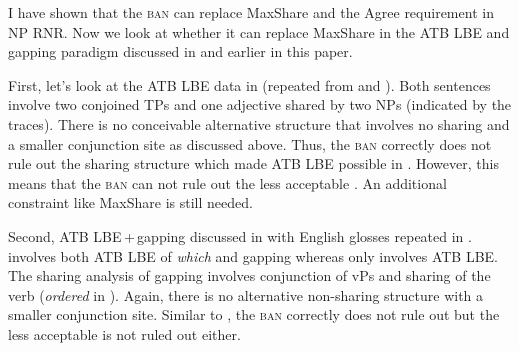 \documentclass[output=paper]{langscibook}
\begin{document}
I have shown that the \textsc{ban} can replace MaxShare and the Agree requirement in NP RNR. Now we look at whether it can replace MaxShare in the ATB LBE and gapping paradigm discussed in \citet{Citko:2006} and earlier in this paper.

First, let's look at the ATB LBE data in  (repeated from  and ). 
Both sentences involve two conjoined TPs and one adjective shared by two NPs (indicated by the traces). 
There is no conceivable alternative structure that involves no sharing and a smaller conjunction site as discussed above.  
Thus, the \textsc{ban} correctly does not rule out the sharing structure which made ATB LBE possible in . 
However, this means that the \textsc{ban} can not rule out the less acceptable . 
An additional constraint like MaxShare is still needed.

\ea 
	\label{shenex33}
	\z 
\z 
Second, ATB LBE\,+\,gapping discussed in  with English glosses repeated in .  involves both ATB LBE of \textit{which} and gapping whereas  only involves ATB LBE.
The sharing analysis of gapping involves conjunction of vPs and sharing of the verb (\textit{ordered} in ). Again, there is no alternative non-sharing structure with a smaller conjunction site. Similar to ,  the \textsc{ban} correctly does not rule out  but the less acceptable  is not ruled out either.
\end{document}
